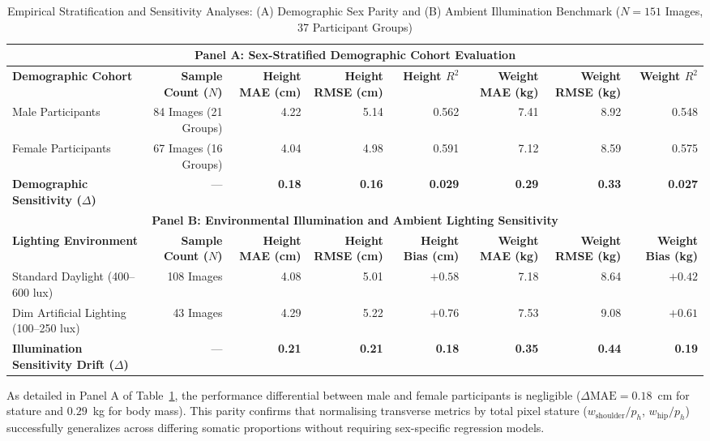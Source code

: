 \documentclass[conference]{IEEEtran}
\begin{document}
\begin{table}[!t]
\caption{Empirical Stratification and Sensitivity Analyses: (A) Demographic Sex Parity and (B) Ambient Illumination Benchmark ($N=151$ Images, 37 Participant Groups)}
\label{tab:sensitivity}
\centering
\footnotesize
\renewcommand{\arraystretch}{1.20}
\begin{tabular*}{\textwidth}{@{\extracolsep{\fill}}lrrrrrrr@{}}
\toprule
\multicolumn{8}{c}{\textbf{Panel A: Sex-Stratified Demographic Cohort Evaluation}} \\
\midrule
\textbf{Demographic Cohort} & \textbf{Sample Count ($N$)} & \textbf{Height MAE (cm)} & \textbf{Height RMSE (cm)} & \textbf{Height $R^2$} & \textbf{Weight MAE (kg)} & \textbf{Weight RMSE (kg)} & \textbf{Weight $R^2$} \\
\midrule
Male Participants & 84 Images (21 Groups) & 4.22 & 5.14 & 0.562 & 7.41 & 8.92 & 0.548 \\
Female Participants & 67 Images (16 Groups) & 4.04 & 4.98 & 0.591 & 7.12 & 8.59 & 0.575 \\
\midrule
\textbf{Demographic Sensitivity ($\Delta$)} & --- & \textbf{0.18} & \textbf{0.16} & \textbf{0.029} & \textbf{0.29} & \textbf{0.33} & \textbf{0.027} \\
\midrule[\heavyrulewidth]
\multicolumn{8}{c}{\textbf{Panel B: Environmental Illumination and Ambient Lighting Sensitivity}} \\
\midrule
\textbf{Lighting Environment} & \textbf{Sample Count ($N$)} & \textbf{Height MAE (cm)} & \textbf{Height RMSE (cm)} & \textbf{Height Bias (cm)} & \textbf{Weight MAE (kg)} & \textbf{Weight RMSE (kg)} & \textbf{Weight Bias (kg)} \\
\midrule
Standard Daylight (400--600 lux) & 108 Images & 4.08 & 5.01 & $+0.58$ & 7.18 & 8.64 & $+0.42$ \\
Dim Artificial Lighting (100--250 lux) & 43 Images & 4.29 & 5.22 & $+0.76$ & 7.53 & 9.08 & $+0.61$ \\
\midrule
\textbf{Illumination Sensitivity Drift ($\Delta$)} & --- & \textbf{0.21} & \textbf{0.21} & \textbf{0.18} & \textbf{0.35} & \textbf{0.44} & \textbf{0.19} \\
\bottomrule
\end{tabular*}
\end{table}

As detailed in Panel A of Table~\ref{tab:sensitivity}, the performance differential between male and female participants is negligible ($\Delta \text{MAE} = 0.18$~cm for stature and $0.29$~kg for body mass). This parity confirms that normalising transverse metrics by total pixel stature ($w_{\text{shoulder}}/p_h$, $w_{\text{hip}}/p_h$) successfully generalizes across differing somatic proportions without requiring sex-specific regression models.
\end{document}
